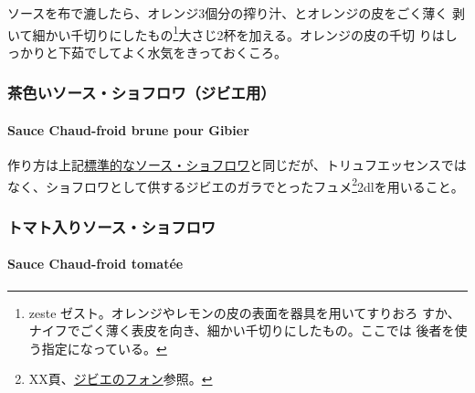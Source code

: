 ソースを布で漉したら、オレンジ3個分の搾り汁、とオレンジの皮をごく薄く
剥いて細かい千切りにしたもの\footnote{zeste
  ゼスト。オレンジやレモンの皮の表面を器具を用いてすりおろ
  すか、ナイフでごく薄く表皮を向き、細かい千切りにしたもの。ここでは
  後者を使う指定になっている。}大さじ2杯を加える。オレンジの皮の千切
りはしっかりと下茹でしてよく水気をきっておくころ。

\maeaki

\hypertarget{ux8336ux8272ux3044ux30bdux30fcux30b9ux30b7ux30e7ux30d5ux30edux30efux30b8ux30d3ux30a8ux7528}{%
\subsubsection{茶色いソース・ショフロワ（ジビエ用）}\label{ux8336ux8272ux3044ux30bdux30fcux30b9ux30b7ux30e7ux30d5ux30edux30efux30b8ux30d3ux30a8ux7528}}

\hypertarget{sauce-chaud-froid-brune-pour-gibier}{%
\paragraph{Sauce Chaud-froid brune pour
Gibier}\label{sauce-chaud-froid-brune-pour-gibier}}


作り方は上記\protect\hyperlink{sauce-chaud-froid-brune}{標準的なソース・ショフロワ}と同じだが、トリュフエッセンスではなく、ショフロワとして供するジビエのガラでとったフュメ\footnote{XX頁、\protect\hyperlink{fonds-de-gibier}{ジビエのフォン}参照。}2dlを用いること。

\maeaki

\hypertarget{ux30c8ux30deux30c8ux5165ux308aux30bdux30fcux30b9ux30b7ux30e7ux30d5ux30edux30ef}{%
\subsubsection{トマト入りソース・ショフロワ}\label{ux30c8ux30deux30c8ux5165ux308aux30bdux30fcux30b9ux30b7ux30e7ux30d5ux30edux30ef}}

\hypertarget{sauce-chaud-froid-tomatee}{%
\paragraph{Sauce Chaud-froid tomatée}\label{sauce-chaud-froid-tomatee}}

